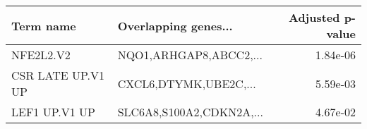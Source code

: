\begin{tabular}{llr}
\toprule
        Term name &     Overlapping genes... &  Adjusted p-value \\
\midrule
        NFE2L2.V2 &   NQO1,ARHGAP8,ABCC2,... &          1.84e-06 \\
CSR LATE UP.V1 UP &    CXCL6,DTYMK,UBE2C,... &          5.59e-03 \\
    LEF1 UP.V1 UP & SLC6A8,S100A2,CDKN2A,... &          4.67e-02 \\
\bottomrule
\end{tabular}
